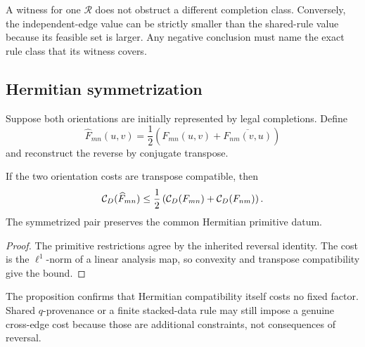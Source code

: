 \begin{remark}
A witness for one \(\mathscr R\) does not obstruct a different completion
class.  Conversely, the independent-edge value can be strictly smaller
than the shared-rule value because its feasible set is larger.  Any
negative conclusion must name the exact rule class that its witness
covers.
\end{remark}

\subsection{Hermitian symmetrization}

Suppose both orientations are initially represented by legal completions.
Define
\[
 \widehat F_{mn}(u,v)
 =
 \frac12
 \left(
 F_{mn}(u,v)+\overline{F_{nm}(v,u)}
 \right)
\]
and reconstruct the reverse by conjugate transpose.

\begin{proposition}
\label{prop:Hermitian-symmetrization}
If the two orientation costs are transpose compatible, then
\[
 \mathcal C_D(\widehat F_{mn})
 \le
 \frac12
 \left(
 \mathcal C_D(F_{mn})+\mathcal C_D(F_{nm})
 \right).
\]
The symmetrized pair preserves the common Hermitian primitive datum.
\end{proposition}

\begin{proof}
The primitive restrictions agree by the inherited reversal identity.
The cost is the \(\ell^1\)-norm of a linear analysis map, so convexity and
transpose compatibility give the bound.
\end{proof}

\begin{remark}
The proposition confirms that Hermitian compatibility itself costs no
fixed factor.  Shared \(q\)-provenance or a finite stacked-data rule may
still impose a genuine cross-edge cost because those are additional
constraints, not consequences of reversal.
\end{remark}
